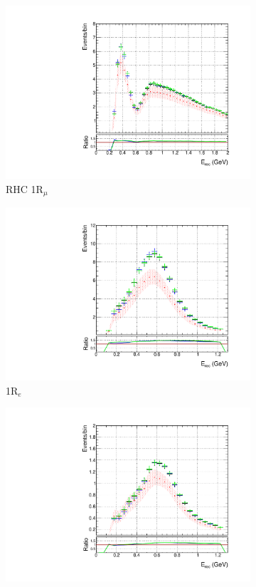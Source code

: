 \begin{figure}
\begin{subfigure}{.49\textwidth}
  \includegraphics[width=0.95\linewidth]{figs/polySKnumubar}
   \caption{RHC 1R$_{\mu}$}
  \label{fig:skppnumubar}
\end{subfigure}
\begin{subfigure}{.49\textwidth}
  \centering
  \includegraphics[width=0.95\linewidth]{figs/polySKnue}
  \caption{1R$_{e}$}
  \label{fig:skppnue}
\end{subfigure}
\begin{subfigure}{.49\textwidth}
  \centering
  \includegraphics[width=0.95\linewidth]{figs/polySKnuebar}

\end{subfigure}
\end{figure}
